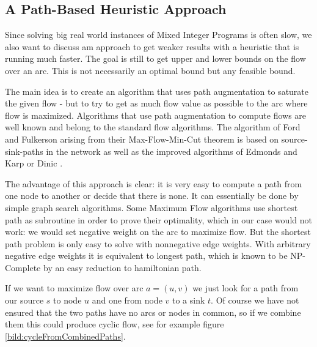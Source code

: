 \newpage
\subsection{A Path-Based Heuristic Approach}
Since solving big real world instances of Mixed Integer Programs is often slow, we also want to discuss am approach 
to get weaker results with a heuristic that is running much faster. The goal is still to get upper and lower bounds 
on the flow over an arc. This is not necessarily an optimal bound but any feasible bound. 

The main idea is to create an algorithm that uses path augmentation to saturate the given flow - but to try to get as 
much flow value as possible to the arc where flow is maximized. Algorithms that use path augmentation to compute flows 
are well known and belong to the standard flow algorithms. The algorithm of Ford and Fulkerson 
\cite{Ford-Fulkerson_algo} arising from their Max-Flow-Min-Cut theorem is based on source-sink-paths in the 
network as well as the improved algorithms of Edmonds and Karp \cite{EdmondsKarp1972} or Dinic \cite{Dinic1970}. 

The advantage of this approach is clear: it is very easy to compute a path from one node to another or decide that 
there is none. It can essentially be done by simple graph search algorithms. Some Maximum Flow algorithms use shortest 
path as subroutine in order to prove their optimality, which in our case would not work: we would set negative weight 
on the arc to maximize flow. But the shortest path problem is only easy to solve with nonnegative edge weights. With 
arbitrary negative edge weights it is equivalent to longest path, which is 
known to be NP-Complete by an easy reduction to hamiltonian path. \cite{}%

If we want to maximize flow over arc $a=(u,v)$ we just look for a path from our source $s$ to node $u$ and one from node 
$v$ to a sink $t$. Of course we have not ensured that the two paths have no arcs or nodes in common, so if we combine 
them this could produce cyclic flow, see for example figure \ref{bild:cycleFromCombinedPaths}. %

